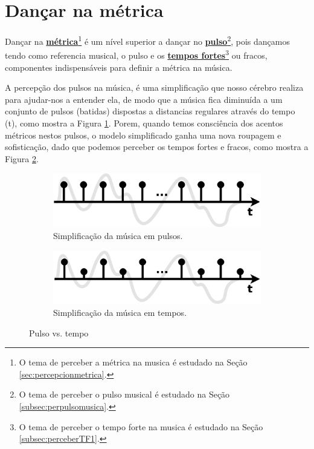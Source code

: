 
\newpage
\section{Dançar na métrica}
\label{subsec:dancametrica}
Dançar na \hyperref[sec:percepcionmetrica]{\textbf{métrica}}\footnote{O 
tema de perceber a métrica na musica é estudado na Seção 
\ref{sec:percepcionmetrica}.} 
é um nível superior a dançar no \hyperref[subsec:perpulsomusica]{\textbf{pulso}}\footnote{O 
tema de perceber o pulso musical é estudado na Seção \ref{subsec:perpulsomusica}.},
pois dançamos tendo como referencia musical, o pulso
e os \hyperref[subsec:perceberTF1]{\textbf{tempos fortes}}\footnote{O 
tema de perceber o tempo forte na musica é estudado na Seção 
\ref{subsec:perceberTF1}.}  ou fracos,
componentes indispensáveis para definir a métrica na música.

A percepção dos pulsos na música, 
é uma simplificação que nosso cérebro realiza para ajudar-nos a entender ela,
de modo que a música fica diminuída a um conjunto de pulsos (batidas) dispostas
a distancias regulares através do tempo (t), como mostra a Figura \ref{fig:metrica:pulso}.
Porem, quando temos consciência dos acentos métricos nestos pulsos,
o modelo simplificado ganha uma nova roupagem e sofisticação, 
dado que podemos perceber os tempos fortes e fracos, como mostra a Figura \ref{fig:metrica:tempo}.
\begin{figure}[!h]
     \centering
     \begin{subfigure}[b]{0.485\textwidth}
         \centering
         \includegraphics[width=\textwidth]{chapters/cap-musicalidade-tecnica/aspectos-metrica-a.eps}
         \caption{Simplificação da música em pulsos.}
         \label{fig:metrica:pulso}
     \end{subfigure}
     \hfill
     \begin{subfigure}[b]{0.485\textwidth}
         \centering
         \includegraphics[width=\textwidth]{chapters/cap-musicalidade-tecnica/aspectos-metrica-b.eps}
         \caption{Simplificação da música em tempos.}
         \label{fig:metrica:tempo}
     \end{subfigure}
        \caption{Pulso vs. tempo}
        \label{fig:metricapulsotempo}
\end{figure}


